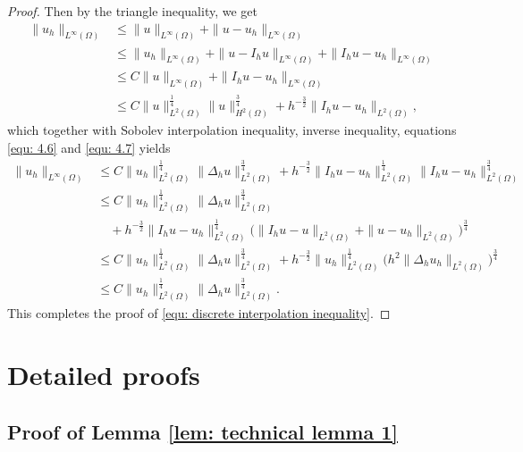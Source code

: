 \documentclass{siamart250211}
\begin{document}
\begin{proof}
Then by the triangle inequality, we get 
\begin{align*}
	\|u_h \|_{L^{\infty}(\Omega)} & \le \|u \|_{L^{\infty}(\Omega)} + \|u - u_h \|_{L^{\infty}(\Omega)} \\
	& \le \|u_h \|_{L^{\infty}(\Omega)} + \|u - I_hu \|_{L^{\infty}(\Omega)} + \|I_hu - u_h \|_{L^{\infty}(\Omega)} \\
	& \le C \|u\|_{L^{\infty}(\Omega)} + \|I_hu - u_h \|_{L^{\infty}(\Omega)} \\
	& \le C \|u\|_{L^2(\Omega)}^{\frac14}\|u\|_{H^2(\Omega)}^{\frac34} + h^{-\frac32} \|I_hu - u_h \|_{L^{2}(\Omega)},  
    \end{align*}
which together with Sobolev interpolation inequality, inverse inequality, equations \eqref{equ: 4.6} and \eqref{equ: 4.7} yields
    \begin{align*}
	\|u_h \|_{L^{\infty}(\Omega)}& \le C \|u_h\|_{L^2(\Omega)}^{\frac14}\|\Delta_h u\|_{L^2(\Omega)}^{\frac34} + h^{-\frac32} \|I_hu - u_h \|_{L^{2}(\Omega)}^{\frac14} \|I_hu - u_h \|_{L^{2}(\Omega)}^{\frac34} \\
	& \le C \|u_h\|_{L^2(\Omega)}^{\frac14}\|\Delta_h u\|_{L^2(\Omega)}^{\frac34} \\
	& \quad + h^{-\frac32} \|I_hu - u_h \|_{L^{2}(\Omega)}^{\frac14} \big( \|I_hu - u \|_{L^{2}(\Omega)} + \|u - u_h \|_{L^{2}(\Omega)}\big)^{\frac34}  \\
	& \le C \|u_h\|_{L^2(\Omega)}^{\frac14}\|\Delta_h u\|_{L^2(\Omega)}^{\frac34} + h^{-\frac32} \| u_h \|_{L^{2}(\Omega)}^{\frac14} \big( h^2 \|\Delta_h u_h \|_{L^2(\Omega)}\big)^{\frac34} \\
	& \le C \|u_h\|_{L^2(\Omega)}^{\frac14}\|\Delta_h u\|_{L^2(\Omega)}^{\frac34}.
\end{align*}
This completes the proof of \eqref{equ: discrete interpolation inequality}.
\end{proof}

\section{Detailed proofs}\label{sec: appendix}

\subsection{Proof of Lemma \ref{lem: technical lemma 1}}
\end{document}
